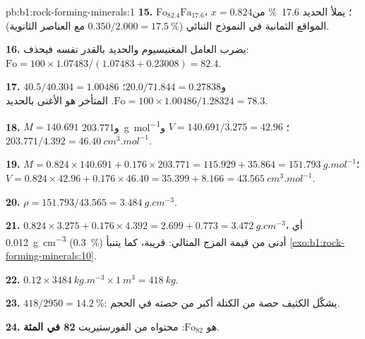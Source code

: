 \begin{solution}{pb:b1:rock-forming-minerals:1}
\textbf{15.} $\text{Fo}_{82.4}\text{Fa}_{17.6}$، $x = 0.824$؛ يملأ الحديد \qty{17.6}{\percent} من المواقع الثمانية في النموذج الثنائي ($0.350/2.000 = \qty{17.5}{\percent}$ مع العناصر الثانوية).

\textbf{16.} يضرب العامل المغنيسيوم والحديد بالقدر نفسه فيحذف: $\mathrm{Fo} = 100\times1.07483/(1.07483 + 0.23008) = 82.4$.

\textbf{17.} $40.5/40.304 = 1.00486$ و$20.0/71.844 = 0.27838$؛
$\mathrm{Fo} = 100\times1.00486/1.28324 = 78.3$.  المتأخر هو الأغنى بالحديد.

\textbf{18.} $M = 140.691$ و\qty{203.771}{g.mol^{-1}}؛
$V = 140.691/3.275 = 42.96$ و$203.771/4.392 =
\qty{46.40}{cm^3.mol^{-1}}$.

\textbf{19.} $M = 0.824\times140.691 + 0.176\times203.771 = 115.929 +
35.864 = \qty{151.793}{g.mol^{-1}}$؛ $V = 0.824\times42.96 +
0.176\times46.40 = 35.399 + 8.166 = \qty{43.565}{cm^3.mol^{-1}}$.

\textbf{20.} $\rho = 151.793/43.565 = \qty{3.484}{g.cm^{-3}}$.

\textbf{21.} $0.824\times3.275 + 0.176\times4.392 = 2.699 + 0.773 =
\qty{3.472}{g.cm^{-3}}$، أي \qty{0.012}{g.cm^{-3}} (\qty{0.3}{\percent}) أدنى من قيمة المزج المثالي: قريبة، كما يتنبأ \cref{exo:b1:rock-forming-minerals:10}.

\textbf{22.} $0.12\times\qty{3484}{kg.m^{-3}}\times\qty{1}{m^3} =
\qty{418}{kg}$.

\textbf{23.} $418/2950 = \qty{14.2}{\percent}$: يشكّل  الكثيف حصة من الكتلة أكبر من حصته في الحجم.

\textbf{24.}  هو $\text{Fo}_{82}$: محتواه من الفورستيريت \textbf{82 في المئة}.
\end{solution}
